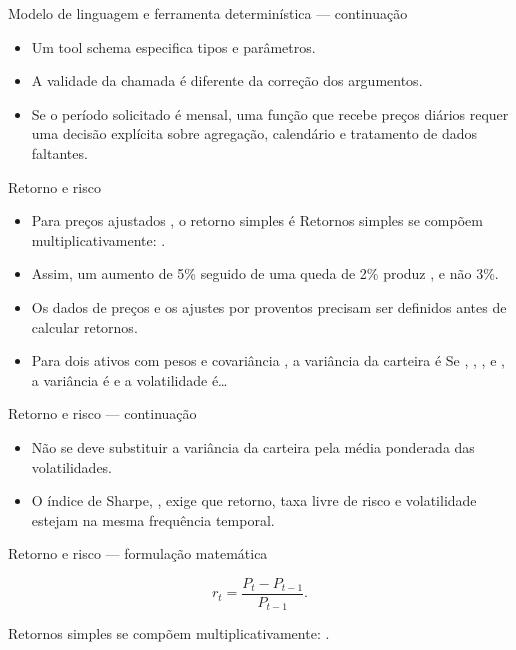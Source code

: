 \documentclass[10pt,aspectratio=169]{beamer}
\begin{document}
\begin{frame}[t]{Modelo de linguagem e ferramenta determinística — continuação}
\small
\begin{itemize}
\item Um tool schema especifica tipos e parâmetros.
\item A validade da chamada é diferente da correção dos argumentos.
\item Se o período solicitado é mensal, uma função que recebe preços diários requer uma decisão explícita sobre agregação, calendário e tratamento de dados faltantes.
\end{itemize}
\end{frame}

\begin{frame}[t]{Retorno e risco}
\small
\begin{itemize}
\item Para preços ajustados , o retorno simples é Retornos simples se compõem multiplicativamente: .
\item Assim, um aumento de 5\% seguido de uma queda de 2\% produz , e não 3\%.
\item Os dados de preços e os ajustes por proventos precisam ser definidos antes de calcular retornos.
\item Para dois ativos com pesos e covariância , a variância da carteira é Se , , , e , a variância é e a volatilidade é…
\end{itemize}
\end{frame}

\begin{frame}[t]{Retorno e risco — continuação}
\small
\begin{itemize}
\item Não se deve substituir a variância da carteira pela média ponderada das volatilidades.
\item O índice de Sharpe, , exige que retorno, taxa livre de risco e volatilidade estejam na mesma frequência temporal.
\end{itemize}
\end{frame}

\begin{frame}[t]{Retorno e risco — formulação matemática}
\small
\vspace{3mm}\begin{center}\small\[r_t=\frac{P_t-P_{t-1}}{P_{t-1}}.\]\end{center}
\vspace{3mm}\small Retornos simples se compõem multiplicativamente: .
\end{frame}
\end{document}
